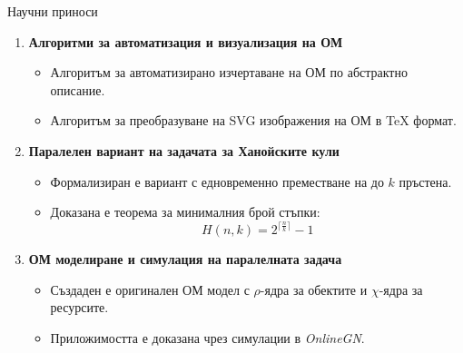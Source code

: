 \documentclass[aspectratio=169]{beamer}
\begin{document}
\begin{frame}{Научни приноси}
\scriptsize
\begin{enumerate}
    \setlength{\itemsep}{0.8em}

    \item \textbf{Алгоритми за автоматизация и визуализация на ОМ}
    \begin{itemize}
        \item Алгоритъм за автоматизирано изчертаване на ОМ по абстрактно описание.
        \item Алгоритъм за преобразуване на SVG изображения на ОМ в \TeX{} формат.
    \end{itemize}

    \item \textbf{Паралелен вариант на задачата за Ханойските кули}
    \begin{itemize}
        \item Формализиран е вариант с едновременно преместване на до $k$ пръстена.
        \item Доказана е теорема за минималния брой стъпки:
        \[
            H(n,k) = 2^{\bigl\lceil \textstyle \frac{n}{k} \bigr\rceil} - 1
        \]
    \end{itemize}

    \item \textbf{ОМ моделиране и симулация на паралелната задача}
    \begin{itemize}
        \item Създаден е оригинален ОМ модел с $\rho$-ядра за обектите и $\chi$-ядра за ресурсите.
        \item Приложимостта е доказана чрез симулации в \textit{OnlineGN}.
    \end{itemize}
\end{enumerate}
\end{frame}
\end{document}
